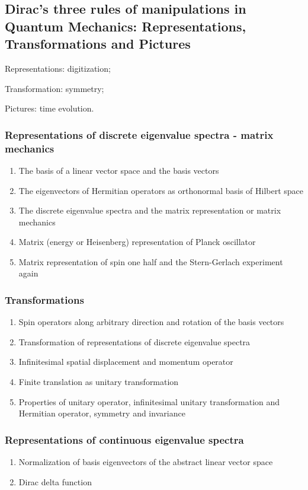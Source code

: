 \documentclass[12pt]{article}
\numberwithin{equation}{section}
\begin{document}
\subsection{Dirac's three rules of manipulations in Quantum Mechanics: 
                       Representations, Transformations and Pictures}
	Representations: digitization;\par
	Transformation: symmetry;\par   
	Pictures: time evolution.                               
\subsubsection{Representations of discrete eigenvalue spectra - matrix mechanics}
\begin{enumerate}
\item The basis of a linear vector space and the basis vectors
\item The eigenvectors of Hermitian operators as orthonormal basis of Hilbert space
\item The discrete eigenvalue spectra and the matrix representation or matrix mechanics
\item Matrix (energy or Heisenberg) representation of Planck oscillator
\item Matrix representation of spin one half and the Stern-Gerlach experiment again
\end{enumerate}
\subsubsection{Transformations}
\begin{enumerate}
\item Spin operators along arbitrary direction and rotation of the basis vectors
\item Transformation of representations of discrete eigenvalue spectra
\item Infinitesimal spatial displacement and momentum operator
\item Finite translation as unitary transformation
\item Properties of unitary operator, infinitesimal unitary transformation and Hermitian operator, symmetry and invariance
\end{enumerate}
\subsubsection{Representations of continuous eigenvalue spectra}
\begin{enumerate}
\item Normalization of basis eigenvectors of the abstract linear vector space
\item Dirac delta function
\end{enumerate}
\end{document}
